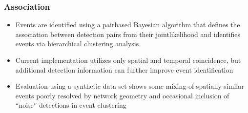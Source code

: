 \documentclass[letterpaper,10pt,english]{sphinxmanual}
\begin{document}
\subsubsection{Association}
\label{\detokenize{algorithms:association}}\begin{itemize}
\item {} 
Events are identified using a pair\sphinxhyphen{}based Bayesian algorithm that defines the association between detection pairs from their joint\sphinxhyphen{}likelihood and identifies events via hierarchical clustering analysis

\item {} 
Current implementation utilizes only spatial and temporal coincidence, but additional detection information can further improve event identification

\item {} 
Evaluation using a synthetic data set shows some mixing of spatially similar events poorly resolved by network geometry and occasional inclusion of “noise” detections in event clustering

\end{itemize}
\end{document}
